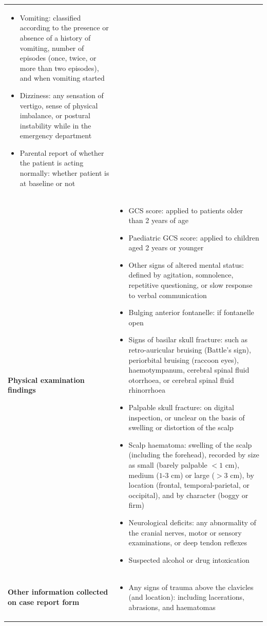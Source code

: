 \documentclass[10pt,letterpaper]{article}
\begin{document}
\begin{table}[htbp]
\begin{tabularx}{\textwidth}{>{\bfseries\hsize=0.3\hsize}X X}
\begin{itemize}[leftmargin=*, nosep]
    \item Vomiting: classified according to the presence or absence of a history of vomiting, number of episodes (once, twice, or more than two episodes), and when vomiting started
    \item Dizziness: any sensation of vertigo, sense of physical imbalance, or postural instability while in the emergency department
    \item Parental report of whether the patient is acting normally: whether patient is at baseline or not
\end{itemize} \\
\addlinespace
Physical examination findings & 
\begin{itemize}[leftmargin=*, nosep]
    \item GCS score: applied to patients older than 2 years of age
    \item Paediatric GCS score: applied to children aged 2 years or younger
    \item Other signs of altered mental status: defined by agitation, somnolence, repetitive questioning, or slow response to verbal communication
    \item Bulging anterior fontanelle: if fontanelle open
    \item Signs of basilar skull fracture: such as retro-auricular bruising (Battle's sign), periorbital bruising (raccoon eyes), haemotympanum, cerebral spinal fluid otorrhoea, or cerebral spinal fluid rhinorrhoea
    \item Palpable skull fracture: on digital inspection, or unclear on the basis of swelling or distortion of the scalp
    \item Scalp haematoma: swelling of the scalp (including the forehead), recorded by size as small (barely palpable $<1\text{ cm}$), medium ($1\text{-}3\text{ cm}$) or large ($>3\text{ cm}$), by location (frontal, temporal-parietal, or occipital), and by character (boggy or firm)
    \item Neurological deficits: any abnormality of the cranial nerves, motor or sensory examinations, or deep tendon reflexes
    \item Suspected alcohol or drug intoxication
\end{itemize} \\
\addlinespace
Other information collected on case report form & 
\begin{itemize}[leftmargin=*, nosep]
    \item Any signs of trauma above the clavicles (and location): including lacerations, abrasions, and haematomas

\end{itemize}
\end{tabularx}
\end{table}
\end{document}
